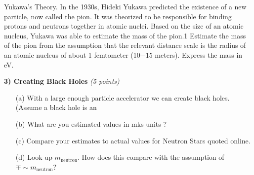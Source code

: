 
Yukawa’s Theory. In the 1930s, Hideki Yukawa predicted the existence of a new particle, now called the pion. It was theorized to be responsible for binding protons and neutrons together in atomic nuclei. Based on the size of an atomic nucleus, Yukawa was able to estimate the mass of the pion.1 Estimate the mass of the pion from the assumption that the relevant distance scale is the radius of an atomic nucleus of about 1 femtometer (10−15 meters). Express the mass in eV.




\textbf{3) Creating Black Holes } \hfill \textit{(5 points)}
\begin{itemize}
\item[(a)] With a large enough particle accelerator we can create black holes. 
(Assume a black hole is an 
 
\item[(b)] What are you estimated values in mks units ?
\item[(c)]Compare your estimates to actual values for Neutron Stars quoted online.
\item[(d)]Look up $m_{\textrm{neutron}}$. How does this compare with the assumption of $\mp \sim m_{\textrm{neutron}}$?
\end{itemize}

\vspace*{0.25in}
